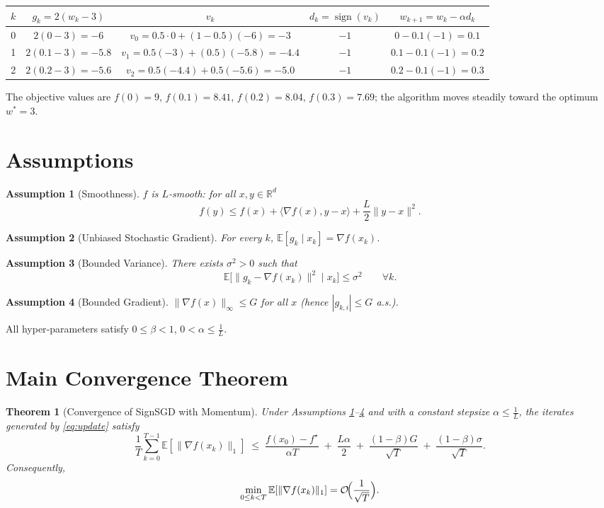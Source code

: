 \documentclass{article}
\newtheorem{theorem}{Theorem}
\newtheorem{assumption}{Assumption}
\newcommand{\sign}{\operatorname{sign}}
\newcommand{\E}{\mathbb{E}}
\newcommand{\R}{\mathbb{R}}
\begin{document}
\begin{center}
\begin{tabular}{c|c|c|c|c}
$k$ & $g_{k}=2(w_{k}-3)$ & $v_{k}$ & $d_{k}= \sign(v_{k})$ & $w_{k+1}=w_{k}-\alpha d_{k}$ \\ \hline
0 & $2(0-3)=-6$ & $v_{0}=0.5\cdot0+(1-0.5)(-6)=-3$ & $-1$ & $0-0.1(-1)=0.1$ \\[2mm]
1 & $2(0.1-3)=-5.8$ & $v_{1}=0.5(-3)+(0.5)(-5.8)=-4.4$ & $-1$ & $0.1-0.1(-1)=0.2$ \\[2mm]
2 & $2(0.2-3)=-5.6$ & $v_{2}=0.5(-4.4)+0.5(-5.6)=-5.0$ & $-1$ & $0.2-0.1(-1)=0.3$
\end{tabular}
\end{center}
The objective values are $f(0)=9$, $f(0.1)=8.41$, $f(0.2)=8.04$, $f(0.3)=7.69$; the algorithm moves steadily toward the optimum $w^{*}=3$.

\newpage
\section*{Assumptions}
\begin{assumption}[Smoothness]\label{as:smooth}
$f$ is $L$‑smooth: for all $x,y\in\R^{d}$
\[
f(y)\le f(x)+\langle \nabla f(x),y-x\rangle+\frac{L}{2}\|y-x\|^{2}.
\]
\end{assumption}
\begin{assumption}[Unbiased Stochastic Gradient]\label{as:unbiased}
For every $k$, $\E[g_{k}\mid x_{k}]=\nabla f(x_{k})$.
\end{assumption}
\begin{assumption}[Bounded Variance]\label{as:variance}
There exists $\sigma^{2}>0$ such that
\[
\E\bigl[\|g_{k}-\nabla f(x_{k})\|^{2}\mid x_{k}\bigr]\le\sigma^{2}\qquad\forall k.
\]
\end{assumption}
\begin{assumption}[Bounded Gradient]\label{as:bounded}
$\|\nabla f(x)\|_{\infty}\le G$ for all $x$ (hence $|g_{k,i}|\le G$ a.s.).
\end{assumption}
All hyper‑parameters satisfy $0\le\beta<1$, $0<\alpha\le \frac{1}{L}$.

\section*{Main Convergence Theorem}
\begin{theorem}[Convergence of SignSGD with Momentum]\label{thm:main}
Under Assumptions \ref{as:smooth}–\ref{as:bounded} and with a constant stepsize $\alpha\le \frac{1}{L}$, the iterates generated by \eqref{eq:update} satisfy
\[
\frac{1}{T}\sum_{k=0}^{T-1}\E\!\left[\|\nabla f(x_{k})\|_{1}\right]
\;\le\;
\frac{f(x_{0})-f^{\star}}{\alpha T}
\;+\;
\frac{L\alpha}{2}
\;+\;
\frac{(1-\beta)G}{\sqrt{T}}\;+\;
\frac{(1-\beta)\sigma}{\sqrt{T}} .
\]
Consequently,
\[
\min_{0\le k<T}\E\!\left[\|\nabla f(x_{k})\|_{1}\right]=
\mathcal{O}\!\Bigl(\frac{1}{\sqrt{T}}\Bigr).
\]
\end{theorem}
\end{document}
